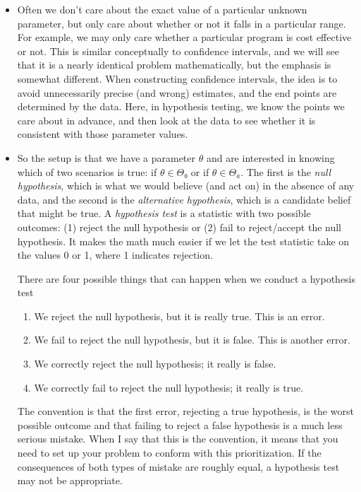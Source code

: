 \begin{itemize}

\item Often we don't care about the exact value of a particular
  unknown parameter, but only care about whether or not it falls in a
  particular range.  For example, we may only care whether a
  particular program is cost effective or not.  This is similar
  conceptually to confidence intervals, and we will see that it is a
  nearly identical problem mathematically, but the emphasis is
  somewhat different.  When constructing confidence intervals, the
  idea is to avoid unnecessarily precise (and wrong) estimates, and
  the end points are determined by the data.  Here, in hypothesis
  testing, we know the points we care about in advance, and then look
  at the data to see whether it is consistent with those parameter
  values.

\item So the setup is that we have a parameter $θ$ and are interested
  in knowing which of two scenarios is true: if $θ ∈ Θ₀$ or if $θ ∈
  Θ_a$.  The first is the \emph{null hypothesis}, which is what we
  would believe (and act on) in the absence of any data, and the
  second is the \emph{alternative hypothesis}, which is a candidate
  belief that might be true.  A \emph{hypothesis test} is a statistic
  with two possible outcomes: (1) reject the null hypothesis or (2)
  fail to reject/accept the null hypothesis.  It makes the math much
  easier if we let the test statistic take on the values 0 or 1, where
  1 indicates rejection.

  There are four possible things that can happen when we conduct a
  hypothesis test
  \begin{enumerate}
  \item We reject the null hypothesis, but it is really true.  This is
    an error.
  \item We fail to reject the null hypothesis, but it is false.  This
    is another error.
  \item We correctly reject the null hypothesis; it really is false.
  \item We correctly fail to reject the null hypothesis; it really is true.
  \end{enumerate}
  The convention is that the first error, rejecting a true hypothesis,
  is the worst possible outcome and that failing to reject a false
  hypothesis is a much less serious mistake.  When I say that this is
  the convention, it means that you need to set up your problem to
  conform with this prioritization.  If the consequences of both types
  of mistake are roughly equal, a hypothesis test may not be
  appropriate.


\end{itemize}
